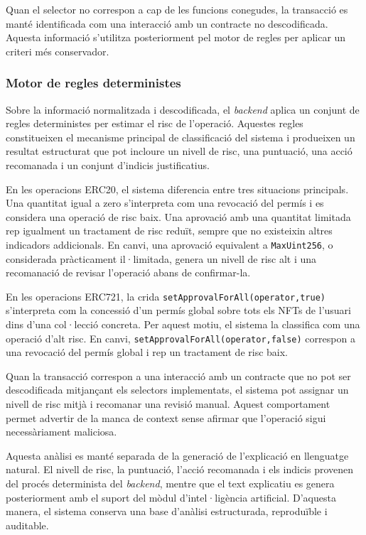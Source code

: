 Quan el selector no correspon a cap de les funcions conegudes, la transacció es manté identificada com una interacció amb un contracte no descodificada. Aquesta informació s’utilitza posteriorment pel motor de regles per aplicar un criteri més conservador.

\subsubsection{Motor de regles deterministes}

Sobre la informació normalitzada i descodificada, el \textit{backend} aplica un conjunt de regles deterministes per estimar el risc de l’operació. Aquestes regles constitueixen el mecanisme principal de classificació del sistema i produeixen un resultat estructurat que pot incloure un nivell de risc, una puntuació, una acció recomanada i un conjunt d’indicis justificatius.

En les operacions ERC20, el sistema diferencia entre tres situacions principals. Una quantitat igual a zero s’interpreta com una revocació del permís i es considera una operació de risc baix. Una aprovació amb una quantitat limitada rep igualment un tractament de risc reduït, sempre que no existeixin altres indicadors addicionals. En canvi, una aprovació equivalent a \texttt{MaxUint256}, o considerada pràcticament il·limitada, genera un nivell de risc alt i una recomanació de revisar l’operació abans de confirmar-la.

En les operacions ERC721, la crida \texttt{setApprovalForAll(operator,true)} s’interpreta com la concessió d’un permís global sobre tots els NFTs de l’usuari dins d’una col·lecció concreta. Per aquest motiu, el sistema la classifica com una operació d’alt risc. En canvi, \texttt{setApprovalForAll(operator,false)} correspon a una revocació del permís global i rep un tractament de risc baix.

Quan la transacció correspon a una interacció amb un contracte que no pot ser descodificada mitjançant els selectors implementats, el sistema pot assignar un nivell de risc mitjà i recomanar una revisió manual. Aquest comportament permet advertir de la manca de context sense afirmar que l’operació sigui necessàriament maliciosa.

Aquesta anàlisi es manté separada de la generació de l’explicació en llenguatge natural. El nivell de risc, la puntuació, l’acció recomanada i els indicis provenen del procés determinista del \textit{backend}, mentre que el text explicatiu es genera posteriorment amb el suport del mòdul d’intel·ligència artificial. D’aquesta manera, el sistema conserva una base d’anàlisi estructurada, reproduïble i auditable.

